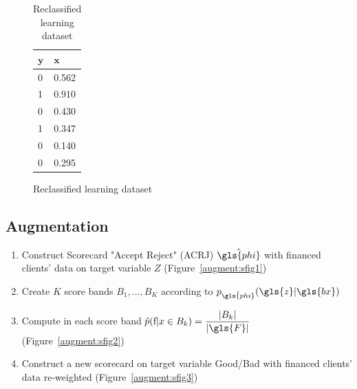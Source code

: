 \begin{table}
{\begin{multicols}{3}
\begin{subfigure}[t]{0.31\textwidth}
\begin{center}
\begin{adjustbox}{max width=\textwidth}
\begin{tabular}{l l}
\toprule
\textbf{${\bm{y}}$} & \textbf{${\bm{x}}$}\\
\midrule
0 & 0.562 \\
1 & 0.910 \\
0 & 0.430 \\
1 & 0.347 \\
0 & 0.140 \\
0 & 0.295 \\
\bottomrule
\end{tabular}
\end{adjustbox}
\end{center}
\caption{Reclassified learning dataset}
\label{reclass:sfig3}
\end{subfigure}

\end{multicols}
}
\end{table}


\subsection{Augmentation} \label{augmentation}

\begin{enumerate}
\item Construct Scorecard "Accept Reject" (ACRJ) $\hat{\gls{phi}}$ with financed clients' data on target variable $Z$ (Figure~\ref{augment:sfig1})
\item Create $K$ score bands $B_1, \ldots, B_K$ according to $p_{\hat{\gls{phi}}}(\gls{z} | \gls{bx})$
\item Compute in each score band $\hat{p}(\text{f}|x \in B_k) = \dfrac{|B_k|}{|\gls{F}|}$ (Figure~\ref{augment:sfig2})
\item Construct a new scorecard on target variable Good/Bad with financed clients' data re-weighted (Figure~\ref{augment:sfig3})
\end{enumerate}

